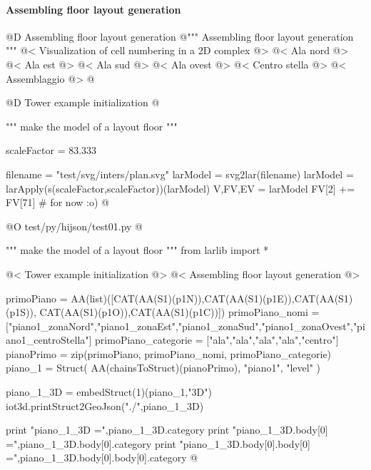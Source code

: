 \documentclass[11pt,oneside]{article}    %
\begin{document}
\paragraph{Assembling floor layout generation}
@D Assembling floor layout generation
@{""" Assembling floor layout generation """
@< Visualization of cell numbering in a 2D complex @>
@< Ala nord @>
@< Ala est @>
@< Ala sud @>
@< Ala ovest @>
@< Centro stella @>
@< Assemblaggio @>
@}



@D Tower example initialization
@{""" make the model of a layout floor """

scaleFactor = 83.333

filename = "test/svg/inters/plan.svg"
larModel = svg2lar(filename)
larModel = larApply(s(scaleFactor,scaleFactor))(larModel)
V,FV,EV = larModel
FV[2] += FV[71]      # for now :o)
@}


@O test/py/hijson/test01.py
@{""" make the model of a layout floor """
from larlib import *

@< Tower example initialization @>
@< Assembling floor layout generation @>

primoPiano = AA(list)([CAT(AA(S1)(p1N)),CAT(AA(S1)(p1E)),CAT(AA(S1)(p1S)), 
                CAT(AA(S1)(p1O)),CAT(AA(S1)(p1C))])
primoPiano_nomi = ["piano1_zonaNord","piano1_zonaEst","piano1_zonaSud","piano1_zonaOvest","piano1_centroStella"]
primoPiano_categorie = ["ala","ala","ala","ala","centro"]
pianoPrimo = zip(primoPiano, primoPiano_nomi, primoPiano_categorie)
piano_1 = Struct( AA(chainsToStruct)(pianoPrimo), "piano1", "level" )

piano_1_3D = embedStruct(1)(piano_1,"3D")
iot3d.printStruct2GeoJson("./",piano_1_3D)

print "piano_1_3D =",piano_1_3D.category
print "piano_1_3D.body[0] =",piano_1_3D.body[0].category
print "piano_1_3D.body[0].body[0] =",piano_1_3D.body[0].body[0].category
@}
\end{document}

